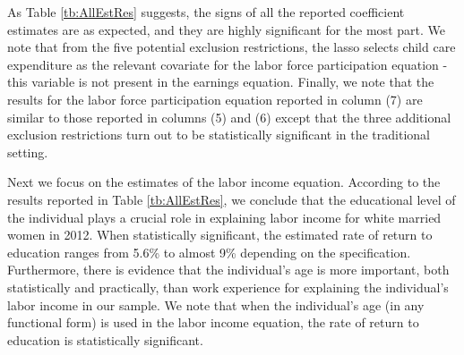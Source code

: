 \documentclass[11pt]{article}
\begin{document}
As Table \ref{tb:AllEstRes} suggests, the signs of all the reported coefficient
estimates %
are as expected, and
they are highly significant for the most part. We note that from the five
potential exclusion restrictions, %
the lasso
selects child care expenditure as the relevant covariate for the labor force participation equation - %
this %
variable %
is not present in %
the earnings equation. Finally, we note that the results for the labor force participation equation reported in %
column (7) are similar
to those reported in columns (5) and (6) except that the three additional exclusion
restrictions %
turn out to be statistically
significant in the traditional setting. 


Next we focus on the estimates of the labor income equation.%
According to the results reported in Table \ref{tb:AllEstRes}, we conclude that the educational
level of the individual plays a crucial role in explaining labor income for
white married women in 2012. When statistically significant, the estimated rate
of return to education ranges from 5.6\% to almost 9\% depending on the
specification. Furthermore, there is evidence %
that the individual's age is
more important, both statistically and practically, than work experience for
explaining the individual's labor income in our sample. We note that when the
individual's age (in any functional form) is used in the labor
income equation, the rate of return to education is statistically
significant. 
\end{document}
